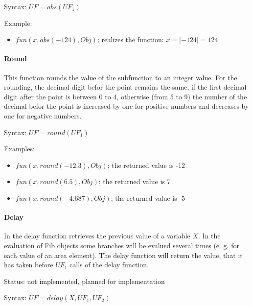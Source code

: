 \bigskip\noindent
Syntax:
$UF=abs( UF_1 )$

\bigskip\noindent
Example:
\begin{itemize}
 \item $fun(x, abs(-124), Obj)$; realizes the function: $x=|-124|=124$
\end{itemize}


\paragraph{Round}

This function rounds the value of the subfunction to an integer value.
For the rounding, the decimal digit befor the point remains the same, if the first decimal digit after the point is between 0 to 4, otherwise (from 5 to 9) the number of the decimal befor the point is increased by one for positive numbers and decreases by one for negative numbers.

\bigskip\noindent
Syntax:
$UF=round( UF_1 )$

\bigskip\noindent
Examples:
\begin{itemize}
 \item $fun(x, round(-12.3), Obj)$; the returned value is -12
 \item $fun(x, round(6.5), Obj)$; the returned value is 7
 \item $fun(x, round(-4.687), Obj)$; the returned value is -5
\end{itemize}


\paragraph{Delay}

In the delay function retrieves the previous value of a variable $X$. In the evaluation of Fib objects some branches will be evalued several times (e. g. for each value of an area element). The delay function will return the value, that it has taken before $UF_1$ calls of the delay function.

\bigskip\noindent
Status: not implemented, planned for implementation

\bigskip\noindent
Syntax:
$UF=delay( X, UF_1, UF_2 )$

